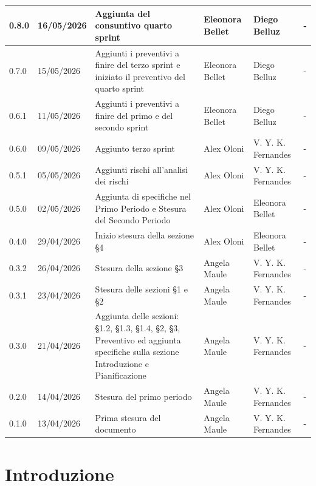 \documentclass[a4paper,12pt]{article}
\begin{document}
\begin{longtable}{|l|l|p{4.5cm}|p{2cm}|p{2.5cm}|p{2.5cm}|}
    0.8.0 & 16/05/2026 & Aggiunta del consuntivo quarto sprint & Eleonora Bellet & Diego Belluz & - \\ \hline
    0.7.0 & 15/05/2026 & Aggiunti i preventivi a finire del terzo sprint e iniziato il preventivo del quarto sprint & Eleonora Bellet & Diego Belluz & - \\ \hline
    0.6.1 & 11/05/2026 & Aggiunti i preventivi a finire del primo e del secondo sprint & Eleonora Bellet & Diego Belluz & - \\ \hline
    0.6.0 & 09/05/2026 & Aggiunto terzo sprint & Alex Oloni & V. Y. K. Fernandes & - \\ \hline
    0.5.1 & 05/05/2026 & Aggiunti rischi all'analisi dei rischi & Alex Oloni & V. Y. K. Fernandes & - \\ \hline
    0.5.0 & 02/05/2026 & Aggiunta di specifiche nel Primo Periodo e Stesura del Secondo Periodo & Alex Oloni & Eleonora Bellet & - \\ \hline
    0.4.0 & 29/04/2026 & Inizio stesura della sezione §4 & Alex Oloni & Eleonora Bellet & - \\ \hline
    0.3.2 & 26/04/2026 & Stesura della sezione §3 & Angela Maule & V. Y. K. Fernandes & - \\ \hline
    0.3.1 & 23/04/2026 & Stesura delle sezioni §1 e §2 & Angela Maule & V. Y. K. Fernandes & - \\ \hline
    0.3.0 & 21/04/2026 & Aggiunta delle sezioni: §1.2, §1.3, §1.4, §2, §3, Preventivo ed aggiunta specifiche sulla sezione Introduzione e Pianificazione & Angela Maule & V. Y. K. Fernandes & - \\ \hline
    0.2.0 & 14/04/2026 & Stesura del primo periodo & Angela Maule & V. Y. K. Fernandes & - \\ \hline
    0.1.0 & 13/04/2026 & Prima stesura del documento & Angela Maule & V. Y. K. Fernandes & - \\ \hline

\end{longtable}

\newpage
{}
\setcounter{page}{1}
\newpage

\tableofcontents
\listoftables
\listoffigures

\newpage

\section{Introduzione}
\label{sec:introduzione}
\end{document}

